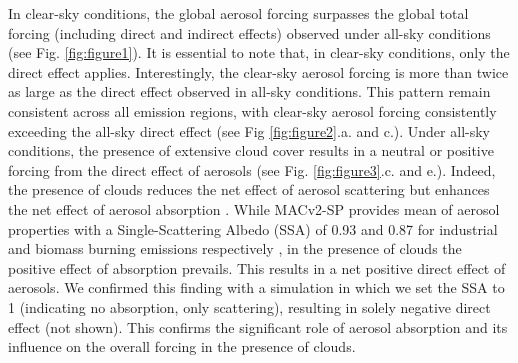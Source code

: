 \documentclass[draft]{agujournal2019}
\begin{document}
            In clear-sky conditions, the global aerosol forcing surpasses the global total forcing (including direct and indirect effects) observed under all-sky conditions (see Fig. \ref{fig:figure1}). It is essential to note that, in clear-sky conditions, only the direct effect applies. Interestingly, the clear-sky aerosol forcing is more than twice as large as the direct effect observed in all-sky conditions. This pattern remain consistent across all emission regions, with clear-sky aerosol forcing consistently exceeding the all-sky direct effect (see Fig \ref{fig:figure2}.a. and c.). 
            Under all-sky conditions, the presence of extensive cloud cover results in a neutral or positive forcing from the direct effect of aerosols (see Fig. \ref{fig:figure3}.c. and e.). Indeed, the presence of clouds reduces the net effect of aerosol scattering but enhances the net effect of aerosol absorption \cite{Li_2022}. While MACv2-SP provides mean of aerosol properties with a Single-Scattering Albedo (SSA) of 0.93 and 0.87 for industrial and biomass burning emissions respectively \cite{Stevens_2017}, in the presence of clouds the positive effect of absorption prevails. This results in a net positive direct effect of aerosols. We confirmed this finding with a simulation in which we set the SSA to 1 (indicating no absorption, only scattering), resulting in solely negative direct effect (not shown). This confirms the significant role of aerosol absorption and its influence on the overall forcing in the presence of clouds.
            
\end{document}
